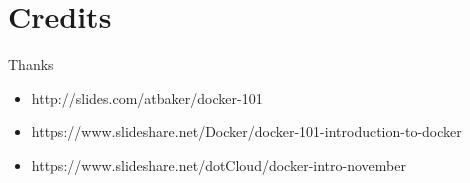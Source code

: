 \documentclass[mathserif,serif]{beamer}
\begin{document}
    \section{Credits}\label{sec:credits}
    \begin{frame}
        \begin{center}
            Thanks
        \end{center}

        \begin{itemize}
            \item http://slides.com/atbaker/docker-101
            \item https://www.slideshare.net/Docker/docker-101-introduction-to-docker
            \item https://www.slideshare.net/dotCloud/docker-intro-november
        \end{itemize}
    \end{frame}
\end{document}
